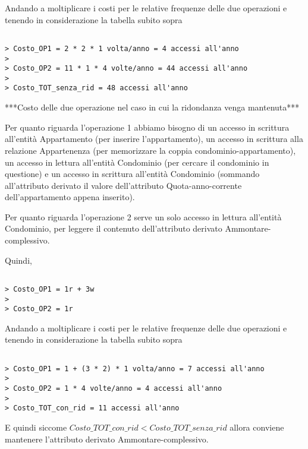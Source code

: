 Andando a moltiplicare i costi per le relative frequenze delle due operazioni e tenendo in considerazione la tabella subito sopra

\begin{verbatim}
	
> Costo_OP1 = 2 * 2 * 1 volta/anno = 4 accessi all'anno
> 
> Costo_OP2 = 11 * 1 * 4 volte/anno = 44 accessi all'anno
>
> Costo_TOT_senza_rid = 48 accessi all'anno

\end{verbatim}

***Costo delle due operazione nel caso in cui la ridondanza venga mantenuta***

Per quanto riguarda l'operazione 1 abbiamo bisogno di un accesso in scrittura all'entità Appartamento (per inserire l'appartamento), un accesso in scrittura alla relazione Appartenenza (per memorizzare la coppia condominio-appartamento), un accesso in lettura all'entità Condominio (per cercare il condominio in questione) e un accesso in scrittura all'entità Condominio (sommando all'attributo derivato il valore dell'attributo Quota-anno-corrente dell'appartamento appena inserito).

Per quanto riguarda l'operazione 2 serve un solo accesso in lettura all'entità Condominio, per leggere il contenuto dell'attributo derivato Ammontare-complessivo.

Quindi,

\begin{verbatim}

> Costo_OP1 = 1r + 3w
> 
> Costo_OP2 = 1r

\end{verbatim}

Andando a moltiplicare i costi per le relative frequenze delle due operazioni e tenendo in considerazione la tabella subito sopra

\begin{verbatim}
	
> Costo_OP1 = 1 + (3 * 2) * 1 volta/anno = 7 accessi all'anno
> 
> Costo_OP2 = 1 * 4 volte/anno = 4 accessi all'anno
>
> Costo_TOT_con_rid = 11 accessi all'anno

\end{verbatim}

E quindi siccome $Costo\_TOT\_con\_rid < Costo\_TOT\_senza\_rid$ allora conviene mantenere l'attributo derivato Ammontare-complessivo.